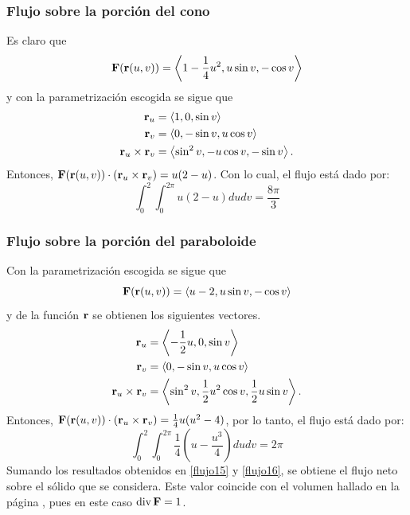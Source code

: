 \begin{parrafonumerado}
\subsubsection{Flujo sobre la porción del cono}

Es claro que \[{\bf F}({\bf r}(u,v))=\left\langle 1-\frac{1}{4}u^{2},u\sin v, -\cos v\right\rangle\] y con la parametrización escogida se sigue que
\begin{align*}
{\bf r}_{u}&=\left\langle 1,0,\sin v\right\rangle \\
{\bf r}_{v}&=\left\langle 0,-\sin v,u\cos v\right\rangle \\
{\bf r}_{u}\times {\bf r}_{v}&= \left\langle \sin ^{2}v,-u\cos v,-\sin v\right\rangle.
\end{align*}
Entonces, ${\bf F}({\bf r}(u,v)) \cdot ({\bf r}_{u}\times {\bf r}_{v}) = u(2-u)$. Con lo cual, el flujo está dado por:
\begin{equation}\label{flujo15}
\int_0^2\int_0^{2\pi} u(2-u) du dv = \frac{8\pi}{3}
\end{equation}

\subsubsection{Flujo sobre la porción del paraboloide}

Con la parametrización escogida se sigue que
\[{\bf F}({\bf r}(u,v))=\left\langle u-2,u\sin v,-\cos v \right\rangle\] y de la función ${\bf r}$
se obtienen los siguientes vectores.
\begin{align*}
{\bf r}_{u}&=\left\langle -\frac{1}{2}u,0,\sin v\right\rangle \\
{\bf r}_{v}&=\left\langle 0,-\sin v,u\cos v\right\rangle \\
{\bf r}_{u}\times {\bf r}_{v}&=\left\langle \sin ^{2}v,\frac{1}{2}u^{2}\cos v,\frac{1}{2}u\sin v\right\rangle.
\end{align*}
Entonces, ${\bf F}({\bf r}(u,v)) \cdot ({\bf r}_{u}\times {\bf r}_{v}) = \frac{1}{4}u(u^2-4)$, por lo tanto, el flujo está dado por:
\begin{equation}\label{flujo16}
\int_0^2\int_0^{2\pi}\frac{1}{4}\left (u-\frac{u^3}{4} \right ) du dv = 2\pi
\end{equation}
Sumando los resultados obtenidos en \ref{flujo15} y \ref{flujo16}, se obtiene el flujo neto sobre el sólido que se considera. Este valor coincide con el volumen hallado en la página \pageref{ejercicio10}, pues en este caso ${\rm div}\,{\bf F}=1$.


\end{parrafonumerado}
